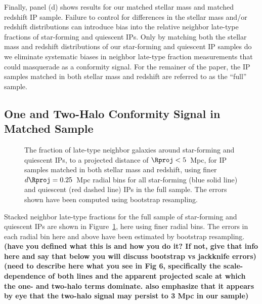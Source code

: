 Finally, panel (d) shows results for our matched stellar mass and matched redshift IP sample.
Failure to control for differences in the stellar mass and/or redshift distributions 
can introduce bias into the relative neighbor late-type fractions of star-forming and quiescent IPs.
Only by matching both the stellar mass and redshift distributions of our star-forming and quiescent IP samples do we eliminate systematic biases in neighbor late-type fraction
measurements that could masquerade as a conformity signal.
For the remainer of the paper, the IP samples matched in both stellar mass and redshift are referred to as the ``full'' sample.


\subsection{One and Two-Halo Conformity Signal in Matched Sample}\label{sec:signal}

\begin{figure}
  \epstrim{0.4in 0.1in 0.3in 0.4in}
  \caption{
The fraction of late-type neighbor galaxies around star-forming 
and quiescent IPs, to a projected distance of {$\Rproj<5$}~Mpc, 
for IP samples matched in both stellar mass and redshift, using 
finer {$d\Rproj=0.25$~Mpc} radial bins for all star-forming (blue solid line) and quiescent (red dashed line) IPs in the full sample.
The errors shown have been computed using bootstrap resampling.
}
  \label{fig:latefrac_full}
\end{figure}


Stacked neighbor late-type fractions for the full sample of star-forming and quiescent IPs are shown in Figure~\ref{fig:latefrac_full}, here using finer radial bins.  The errors in each radial bin here and above have been estimated by bootstrap 
resampling. {\bf(have you defined what this is and how you do it?  If not, give that info here and say that below you will discuss bootstrap vs jackknife errors)}
{\bf(need to describe here what you see in Fig 6, specifically the scale-dependence of both lines and the apparent projected scale at which the one- and two-halo terms dominate. also emphasize that it appears by eye that the two-halo signal may persist to 3 Mpc in our sample)}





